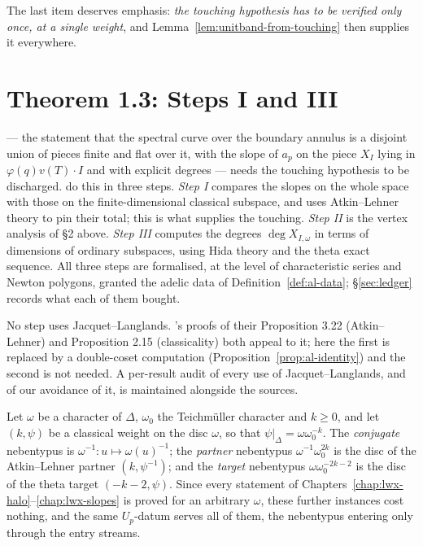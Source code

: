 The last item deserves emphasis: \emph{the touching hypothesis has to be verified only once, at a
single weight}, and Lemma~\ref{lem:unitband-from-touching} then supplies it everywhere.

\section{Theorem 1.3: Steps I and III}
\label{sec:stepone}

\cite[Theorem 1.3]{LWX} --- the statement that the spectral curve over the boundary annulus is a
disjoint union of pieces finite and flat over it, with the slope of $a_p$ on the piece $X_I$
lying in $\varphi(q)v(T)\cdot I$ and with explicit degrees --- needs the touching hypothesis to be
discharged.  \cite[\S3.23]{LWX} do this in three steps.  \emph{Step I} compares the slopes on the
whole space with those on the finite-dimensional classical subspace, and uses Atkin--Lehner
theory to pin their total; this is what supplies the touching.  \emph{Step II} is the vertex
analysis of \S2 above.  \emph{Step III} computes the degrees $\deg X_{I,\omega}$ in terms of
dimensions of ordinary subspaces, using Hida theory and the theta exact sequence.  All three steps
are formalised, at the level of characteristic series and Newton polygons, granted the adelic
data of Definition~\ref{def:al-data}; \S\ref{sec:ledger} records what each of them bought.

No step uses Jacquet--Langlands.  \cite{LWX}'s proofs of their Proposition 3.22 (Atkin--Lehner)
and Proposition 2.15 (classicality) both appeal to it; here the first is replaced by a
double-coset computation (Proposition~\ref{prop:al-identity}) and the second is not needed.  A
per-result audit of every use of Jacquet--Langlands, and of our avoidance of it, is maintained
alongside the sources.

\begin{definition}
  \label{def:conjchar}
  \leanok
  Let $\omega$ be a character of $\Delta$, $\omega_0$ the Teichm\"uller character and $k \geq 0$,
  and let $(k,\psi)$ be a classical weight on the disc $\omega$, so that
  $\psi|_\Delta = \omega\omega_0^{-k}$.  The \emph{conjugate} nebentypus is
  $\omega^{-1} : u \mapsto \omega(u)^{-1}$; the \emph{partner} nebentypus
  $\omega^{-1}\omega_0^{2k}$ is the disc of the Atkin--Lehner partner $(k,\psi^{-1})$; and the
  \emph{target} nebentypus $\omega\omega_0^{-2k-2}$ is the disc of the theta target
  $(-k-2,\psi)$.  Since every statement of Chapters~\ref{chap:lwx-halo}--\ref{chap:lwx-slopes} is
  proved for an arbitrary $\omega$, these further instances cost nothing, and the same $U_p$-datum
  serves all of them, the nebentypus entering only through the entry streams.
\end{definition}

